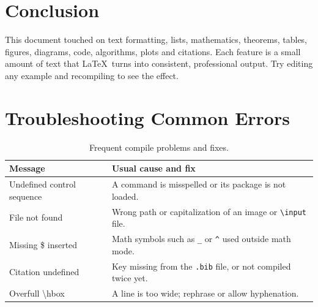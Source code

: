\documentclass[12pt, a4paper]{article}
\theoremstyle{plain}
\theoremstyle{definition}
\begin{document}
\section{Conclusion}
This document touched on text formatting, lists, mathematics, theorems, tables, figures, diagrams, code, algorithms, plots and citations. Each feature is a small amount of text that \LaTeX\ turns into consistent, professional output. Try editing any example and recompiling to see the effect.




\appendix
\section{Troubleshooting Common Errors}
\begin{table}[htbp]
    \centering
    \caption{Frequent compile problems and fixes.}
    \label{tab:errors}
    \begin{tabularx}{\textwidth}{>{\raggedright\ttfamily\arraybackslash}p{4.6cm}X}
        \toprule
        \textbf{Message} & \textbf{Usual cause and fix} \\
        \midrule
        Undefined control sequence & A command is misspelled or its package is not loaded. \\
        File not found & Wrong path or capitalization of an image or \texttt{\textbackslash input} file. \\
        Missing \$ inserted & Math symbols such as \texttt{\_} or \texttt{\textasciicircum} used outside math mode. \\
        Citation undefined & Key missing from the \texttt{.bib} file, or not compiled twice yet. \\
        Overfull \textbackslash hbox & A line is too wide; rephrase or allow hyphenation. \\
        \bottomrule
    \end{tabularx}
\end{table}
\end{document}
